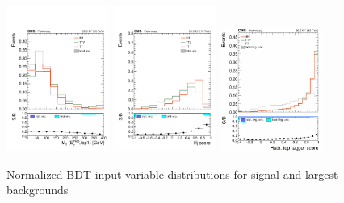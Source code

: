 \begin{figure}[htp]
\centering
\includegraphics[width=0.3\textwidth]{ch8_figs/kinMVA_input_MT_met_lep1.pdf}
\includegraphics[width=0.3\textwidth]{ch8_figs/kinMVA_input_BDTv8_eventReco_Hj_score.pdf}
\includegraphics[width=0.3\textwidth]{ch8_figs/kinMVA_input_BDTv8_eventReco_mvaValue.pdf}
\caption[Signal extraction BDT input variables]{Normalized BDT input variable distributions for signal and largest backgrounds}
\label{fig:inputs2.5}
\end{figure}

